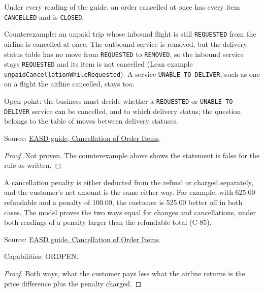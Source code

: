 \begin{theorem}
  \label{thm:change-cancellation-cancelled-closed}
  Under every reading of the guide, an order cancelled at once has every item
  \texttt{CANCELLED} and is \texttt{CLOSED}.

  Counterexample: an unpaid trip whose inbound flight is still
  \texttt{REQUESTED} from the airline is cancelled at once.  The outbound
  service is removed, but the delivery status table has no move from
  \texttt{REQUESTED} to \texttt{REMOVED}, so the inbound service stays
  \texttt{REQUESTED} and its item is not cancelled (Lean example
  \texttt{unpaidCancellationWhileRequested}).  A service \texttt{UNABLE TO
  DELIVER}, such as one on a flight the airline cancelled, stays too.

  Open point: the business must decide whether a \texttt{REQUESTED} or
  \texttt{UNABLE TO DELIVER} service can be cancelled, and to which delivery
  status; the question belongs to the table of moves between delivery
  statuses.

  Source: \href{https://standards.atlassian.net/wiki/spaces/EASD/pages/574783569/Cancellation+of+Order+Items}{EASD guide, Cancellation of Order Items}.
\end{theorem}
\begin{proof}
  Not proven.  The counterexample above shows the statement is false for the
  rule as written.
\end{proof}

\begin{theorem}
  \label{thm:c16-penalty-net}
  A cancellation penalty is either deducted from the refund or charged
  separately, and the customer's net amount is the same either way.  For
  example, with 625.00 refundable and a penalty of 100.00, the customer is
  525.00 better off in both cases.  The model proves the two ways equal for
  changes and cancellations, under both readings of a penalty larger than the
  refundable total (C-85).

  Source: \href{https://standards.atlassian.net/wiki/spaces/EASD/pages/574783569/Cancellation+of+Order+Items}{EASD guide, Cancellation of Order Items}.

  Capabilities: ORDPEN.
\end{theorem}
\begin{proof}
  Both ways, what the customer pays less what the airline returns is the price
  difference plus the penalty charged.
\end{proof}

